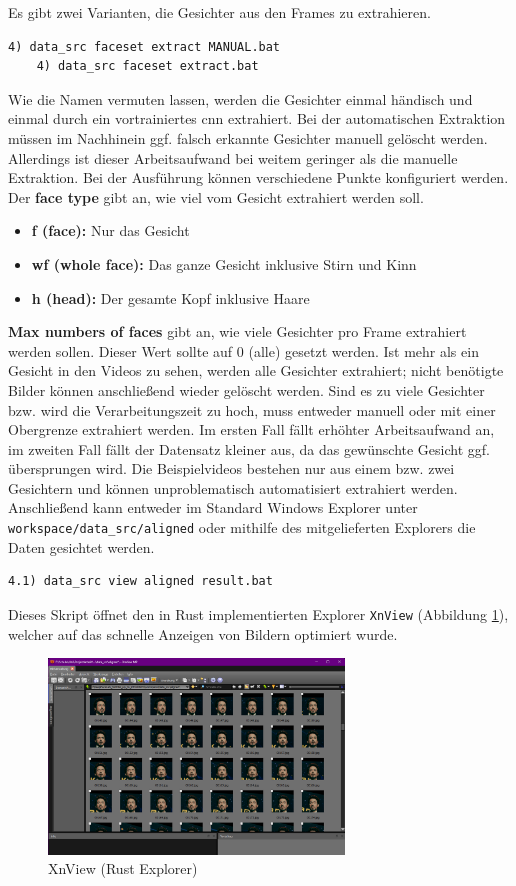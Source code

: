 Es gibt zwei Varianten, die Gesichter aus den Frames zu extrahieren.
\begin{lstlisting}[numbers=none,label={lst:extraction-2}]
    4) data_src faceset extract MANUAL.bat
    4) data_src faceset extract.bat
\end{lstlisting}
Wie die Namen vermuten lassen, werden die Gesichter einmal händisch und einmal durch ein vortrainiertes \gls{cnn} extrahiert.
Bei der automatischen Extraktion müssen im Nachhinein ggf. falsch erkannte Gesichter manuell gelöscht werden.
Allerdings ist dieser Arbeitsaufwand bei weitem geringer als die manuelle Extraktion.
Bei der Ausführung können verschiedene Punkte konfiguriert werden.
Der \textbf{face type} gibt an, wie viel vom Gesicht extrahiert werden soll.
\begin{itemize}
    \item \textbf{f (face):} Nur das Gesicht
    \item \textbf{wf (whole face):} Das ganze Gesicht inklusive Stirn und Kinn
    \item \textbf{h (head):} Der gesamte Kopf inklusive Haare
\end{itemize}
\textbf{Max numbers of faces} gibt an, wie viele Gesichter pro Frame extrahiert werden sollen.
Dieser Wert sollte auf 0 (alle) gesetzt werden.
Ist mehr als ein Gesicht in den Videos zu sehen, werden alle Gesichter extrahiert; nicht benötigte Bilder können anschließend wieder gelöscht werden.
Sind es zu viele Gesichter bzw. wird die Verarbeitungszeit zu hoch, muss entweder manuell oder mit einer Obergrenze extrahiert werden.
Im ersten Fall fällt erhöhter Arbeitsaufwand an, im zweiten Fall fällt der Datensatz kleiner aus, da das gewünschte Gesicht ggf. übersprungen wird.
Die Beispielvideos bestehen nur aus einem bzw. zwei Gesichtern und können unproblematisch automatisiert extrahiert werden.
Anschließend kann entweder im Standard Windows Explorer unter \texttt{workspace/data\_src/aligned} oder mithilfe des mitgelieferten Explorers die Daten gesichtet werden.
\begin{lstlisting}[label={lst:extraction-3},numbers=none]
    4.1) data_src view aligned result.bat
\end{lstlisting}
Dieses Skript öffnet den in Rust implementierten Explorer \texttt{XnView} (Abbildung \ref{fig:xnview}), welcher auf das schnelle Anzeigen von Bildern optimiert wurde.
\begin{figure}
    \center
    \includegraphics[width=0.7\textwidth]{Bilder/DFL/XnView}
    \caption{XnView (Rust Explorer)}
    \label{fig:xnview}
\end{figure}
